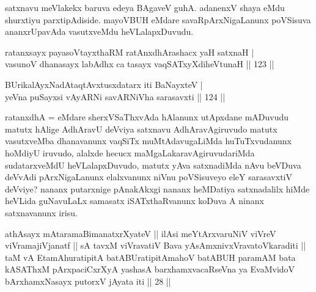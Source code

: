 \begin{artha}
satxnavu meVlakekx baruva edeya BAgaveV guhA. adanenxV shaya eMdu 
shurxtiyu parxtipAdiside. mayoVBUH eMdare savaRpArxNigaLanunx 
poVSisuva ananxrUpavAda vasutxveMdu heVLalapxDuvudu.
\end{artha}


\begin{shl}
ratanxsayx payasoV\s tayxthaRM ratAnxdhArashacx yaH satxnaH | \\
vasunoV dhanasayx labAdhx ca tasayx vaqSATxyXdiheVtunaH \hfill|| 123 || 
\end{shl}

\begin{shl}
BUrikalAyxNadAtaqtAvxtusxdatarx iti BaNayxteV | \\
yeVna puSayxsi vAyARNi savARNiVha sarasavxti \hfill|| 124 || 
\end{shl}

\begin{artha}
ratanxdhA = eMdare sherxVSaThxvAda hAlanunx utApxdane mADuvudu matutx hAlige AdhAravU deVviya satxnavu AdhAravAgiruvudo matutx vasutxveMba dhanavanunx vaqSiTx muMtAdavugaLiMda huTuTxvudanunx hoMdiyU iruvudo, alalxde hecucx maMgaLakaravAgiruvudariMda sudatarxveMdU heVLalapxDuvudo, matutx yAva satxnadiMda nAvu beVDuva deVvAdi pArxNigaLanunx elalxvanunx niVnu poVSisuveyo eleY sarasavxtiV deVviye? nananx putarxnige pAnakAkxgi nananx heMDatiya satxnadalilx hiMde heVLida guNavuLaLx samasatx iSATxthaRvanunx koDuva A ninanx satxnavanunx irisu.
\end{artha}


\begin{shl}
\footnotemark[1]athAsayx mAtaramaBimanatxrXyateV || ilAsi meYtArxvaruNiV viVreV viVramajiVjanatf || sA tavxM viVravatiV Bava yAsAmxnivxVravatoV\s karaditi || taM vA EtamAhuratipitA batABUratipitAmahoV batABUH paramAM bata kASAThxM pArxpaciCxrXyA yashasA barxhamxvacaRseVna ya EvaMvidoV bArxhamxNasayx putorxV jAyata iti || 28 ||
\end{shl}

